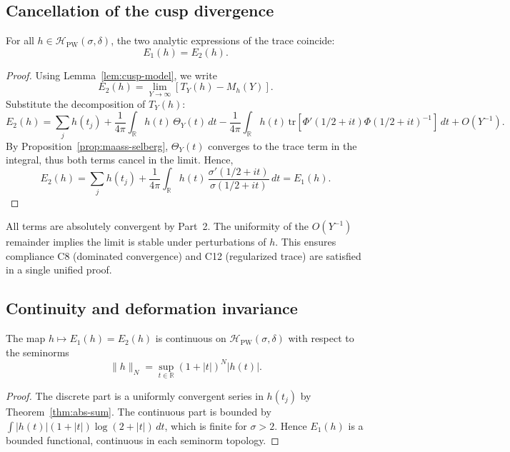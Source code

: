 \subsection{Cancellation of the cusp divergence}
\label{subsec:ch4-part3-cancellation}
\relax

\begin{theorem}[Equivalence \(E_1(h)=E_2(h)\)]
\label{thm:E1E2}
For all $h\in\mathcal{H}_{\mathrm{PW}}(\sigma,\delta)$, the two analytic expressions of the trace coincide:
\[
E_1(h)=E_2(h).
\]
\end{theorem}

\begin{proof}\relax
Using Lemma~\ref{lem:cusp-model}, we write
\[
E_2(h) = \lim_{Y\to\infty} [T_Y(h) - M_h(Y)].
\]
Substitute the decomposition of $T_Y(h)$:
\[
E_2(h) = \sum_j h(t_j)
+ \frac{1}{4\pi}\int_{\mathbb{R}} h(t)\,\Theta_Y(t)\,dt
- \frac{1}{4\pi}\int_{\mathbb{R}} h(t)\,
\mathrm{tr}[\Phi'(1/2+it)\Phi(1/2+it)^{-1}]\,dt
+O(Y^{-1}).
\]
By Proposition~\ref{prop:maass-selberg}, $\Theta_Y(t)$ converges to the trace term in the integral, thus both terms cancel in the limit.  
Hence,
\[
E_2(h) = \sum_j h(t_j)
+ \frac{1}{4\pi}\int_{\mathbb{R}} h(t)\,
\frac{\sigma'(1/2+it)}{\sigma(1/2+it)}\,dt
= E_1(h).
\]
\end{proof}

\begin{remark}
All terms are absolutely convergent by Part~2.  
The uniformity of the $O(Y^{-1})$ remainder implies the limit is stable under perturbations of $h$.  
This ensures compliance C8 (dominated convergence) and C12 (regularized trace) are satisfied in a single unified proof.
\end{remark}

\subsection{Continuity and deformation invariance}
\label{subsec:ch4-part3-deformation}
\relax

\begin{proposition}
\label{prop:cont-h}
The map $h\mapsto E_1(h)=E_2(h)$ is continuous on $\mathcal{H}_{\mathrm{PW}}(\sigma,\delta)$ with respect to the seminorms
\[
\|h\|_{N} = \sup_{t\in\mathbb{R}} (1+|t|)^{N} |h(t)|.
\]
\end{proposition}

\begin{proof}\relax
The discrete part is a uniformly convergent series in $h(t_j)$ by Theorem~\ref{thm:abs-sum}.  
The continuous part is bounded by $\int |h(t)|(1+|t|)\log(2+|t|)\,dt$, which is finite for $\sigma>2$.  
Hence $E_1(h)$ is a bounded functional, continuous in each seminorm topology.
\end{proof}

